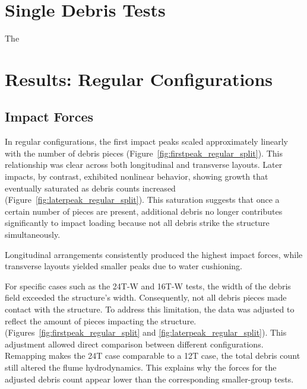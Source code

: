\documentclass{article}
\begin{document}
\section{Single Debris Tests} 
The 

\section{Results: Regular Configurations}

\subsection{Impact Forces} In regular configurations, the first impact peaks scaled approximately linearly with the number of debris pieces (Figure~\ref{fig:firstpeak_regular_split}). This relationship was clear across both longitudinal and transverse layouts. Later impacts, by contrast, exhibited nonlinear behavior, showing growth that eventually saturated as debris counts increased (Figure~\ref{fig:laterpeak_regular_split}). This saturation suggests that once a certain number of pieces are present, additional debris no longer contributes significantly to impact loading because not all debris strike the structure simultaneously.

Longitudinal arrangements consistently produced the highest impact forces, while transverse layouts yielded smaller peaks due to water cushioning.

For specific cases such as the 24T-W and 16T-W tests, the width of the debris field exceeded the structure’s width. Consequently, not all debris pieces made contact with the structure. To address this limitation, the data was adjusted to reflect the amount of pieces impacting the structure.  (Figures~\ref{fig:firstpeak_regular_split} and \ref{fig:laterpeak_regular_split}). This adjustment allowed direct comparison between different configurations. Remapping makes the 24T case comparable to a 12T case, the total debris count still altered the flume hydrodynamics. This explains why the forces for the adjusted debris count appear lower than the corresponding
smaller-group tests. 
\end{document}
